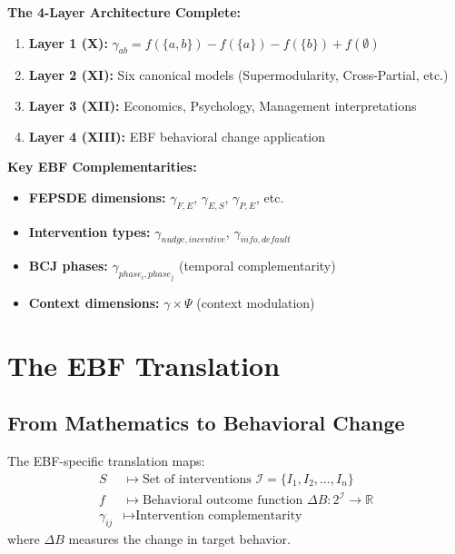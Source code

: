 \begin{tcolorbox}[colback=blue!5!white,colframe=blue!75!black,title=\textbf{Quick Reference: EBF Complementarity}]
\textbf{The 4-Layer Architecture Complete:}
\begin{enumerate}[noitemsep]
    \item \textbf{Layer 1 (X):} $\gamma_{ab} = f(\{a,b\}) - f(\{a\}) - f(\{b\}) + f(\emptyset)$
    \item \textbf{Layer 2 (XI):} Six canonical models (Supermodularity, Cross-Partial, etc.)
    \item \textbf{Layer 3 (XII):} Economics, Psychology, Management interpretations
    \item \textbf{Layer 4 (XIII):} EBF behavioral change application
\end{enumerate}

\textbf{Key EBF Complementarities:}
\begin{itemize}[noitemsep]
    \item \textbf{FEPSDE dimensions:} $\gamma_{F,E}$, $\gamma_{E,S}$, $\gamma_{P,E}$, etc.
    \item \textbf{Intervention types:} $\gamma_{nudge,incentive}$, $\gamma_{info,default}$
    \item \textbf{BCJ phases:} $\gamma_{phase_i, phase_j}$ (temporal complementarity)
    \item \textbf{Context dimensions:} $\gamma \times \Psi$ (context modulation)
\end{itemize}
\end{tcolorbox}

\section{The EBF Translation}
\label{sec:ebf-translation}

\subsection{From Mathematics to Behavioral Change}

\begin{definition}
The EBF-specific translation maps:
\begin{align}
S &\mapsto \text{Set of interventions } \mathcal{I} = \{I_1, I_2, \ldots, I_n\} \\
f &\mapsto \text{Behavioral outcome function } \Delta B: 2^\mathcal{I} \to \mathbb{R} \\
\gamma_{ij} &\mapsto \text{Intervention complementarity}
\end{align}
where $\Delta B$ measures the change in target behavior.
\end{definition}

